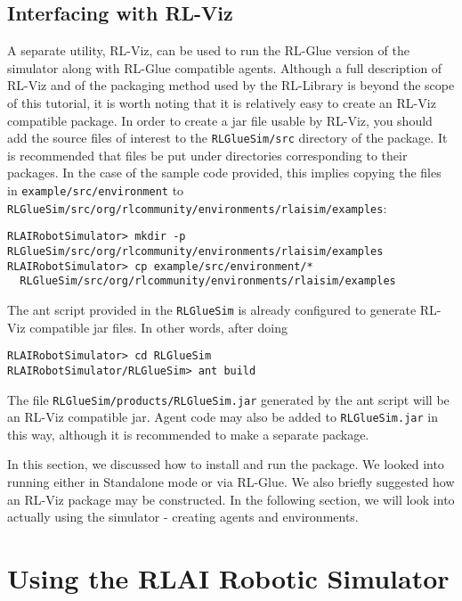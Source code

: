 \documentclass[12pt]{article}
\newcommand{\code}[1]{\texttt{#1}}
\begin{document}
\subsection{Interfacing with RL-Viz}

A separate utility, RL-Viz, can be used to run the RL-Glue version of the
simulator along with RL-Glue compatible agents. Although a full description
of RL-Viz and of the packaging method used by the RL-Library is beyond the 
scope of this tutorial, it is worth noting that it is relatively easy to 
create an RL-Viz compatible package.
In order to create a jar file usable by RL-Viz, you should add the
source files of interest to the \code{RLGlueSim/src} directory of the package.
It is recommended that files be put under directories corresponding to their
packages. In the case of the sample code provided, this implies copying the
files in \code{example/src/environment} to 
\code{RLGlueSim/src/org/rlcommunity/environments/rlaisim/examples}:

\begin{verbatim}
RLAIRobotSimulator> mkdir -p RLGlueSim/src/org/rlcommunity/environments/rlaisim/examples
RLAIRobotSimulator> cp example/src/environment/* 
  RLGlueSim/src/org/rlcommunity/environments/rlaisim/examples
\end{verbatim}

The ant script provided in the \code{RLGlueSim} is already configured to 
generate RL-Viz compatible jar files. In other words, after doing

\begin{verbatim}
RLAIRobotSimulator> cd RLGlueSim
RLAIRobotSimulator/RLGlueSim> ant build
\end{verbatim}

The file \code{RLGlueSim/products/RLGlueSim.jar} generated by the ant script
will be an RL-Viz compatible jar. Agent code may also be added to 
\code{RLGlueSim.jar} in this way, although it is recommended to make a separate
package.

In this section, we discussed how to install and run the package. We looked
into running either in Standalone mode or via RL-Glue. We also briefly
suggested how an RL-Viz package may be constructed. In the following section,
we will look into actually using the simulator - creating agents and
environments.

\section{Using the RLAI Robotic Simulator}
\end{document}
